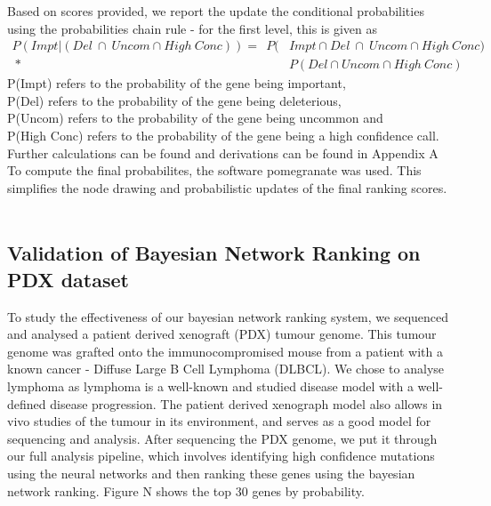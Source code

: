 \documentclass{article}
\begin{document}
Based on scores provided, we report the update the conditional probabilities using the probabilities chain rule - for the first level, this is given as \\
\begin{equation}
\begin{split}
P(Impt | (Del  \ \cap \ Uncom  \cap High\ Conc)) =  \ \ P(&Impt \cap Del  \ \cap \ Uncom \cap High \ Conc ) \\ \ * \ & P(Del  \cap Uncom  \cap High \ Conc )
\end{split}
\end{equation}
\tiny
\indent
P(Impt) refers to the probability of the gene being important,\\
\indent P(Del) refers to the probability of the gene being deleterious,\\ 
\indent P(Uncom) refers to the probability of the gene being uncommon and\\  \indent P(High Conc) refers to the probability of the gene being a high confidence call.\\ \indent Further calculations can be found and derivations can be found in Appendix A\\

\normalsize
\noindent
To compute the final probabilites, the software pomegranate was used. This simplifies the node drawing and probabilistic updates of the final ranking scores. \\\\


\subsection{Validation of Bayesian Network Ranking on PDX dataset}
To study the effectiveness of our bayesian network ranking system, we sequenced and analysed a patient derived xenograft (PDX) tumour genome. This tumour genome was grafted onto the immunocompromised mouse from a patient with a known cancer - Diffuse Large B Cell Lymphoma (DLBCL). We chose to analyse lymphoma as lymphoma is a well-known and studied disease model with a well-defined disease progression. The patient derived xenograph model also allows in vivo studies of the tumour in its environment, and serves as a good model for sequencing and analysis. After sequencing the PDX genome, we put it through our full analysis pipeline, which involves identifying high confidence mutations using the neural networks and then ranking these genes using the bayesian network ranking. Figure N shows the top 30 genes by probability. 
\end{document}
